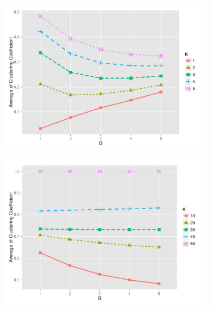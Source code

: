 \documentclass[preprint,number]{elsarticle}
\begin{document}
        \begin{figure}[H]
          \centering
          \begin{subfigure}{.5\linewidth}
            \centering
            \includegraphics[width=1\linewidth]{"../analysis/pdf/network_properties_cc_line_sf_kreg_12345"}
            \caption{}
            \label{fig:network_properties_cc_line_sf_kreg_12345}
          \end{subfigure}%
          \begin{subfigure}{.5\linewidth}
            \centering
            \includegraphics[width=1\linewidth]{"../analysis/pdf/network_properties_cc_line_sf_kreg_1020304050"}
            \caption{}
            \label{fig:network_properties_cc_line_sf_kreg_1020304050}
          \end{subfigure}

\end{figure}
\end{document}
